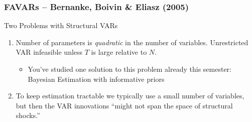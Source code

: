 \documentclass[handout]{beamer}
\begin{document}
\begin{frame}[c]\frametitle{FAVARs -- Bernanke, Boivin \& Eliasz (2005)}
   
   \begin{block}
    	{Two Problems with Structural VARs}
    	\begin{enumerate}
    		\item Number of parameters is \emph{quadratic} in the number of variables. Unrestricted VAR infeasible unless $T$ is large relative to $N$.\begin{itemize}
    			\item You've studied one solution to this problem already this semester: Bayesian Estimation with informative priors 
    		\end{itemize}
    		\item To keep estimation tractable we typically use a small number of variables, but then the VAR innovations ``might not span the space of structural shocks.''
    	\end{enumerate}
    \end{block} 


\end{frame}
\end{document}
